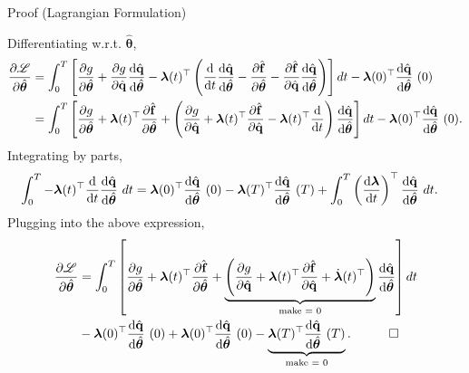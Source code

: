 \begin{frame}{Proof (Lagrangian Formulation)}

{\scriptsize
Differentiating w.r.t. $\hat{\bm{\theta}}$,
\begin{align*}
    \pdv{\mathscr{L}}{\hat{\bm{\theta}}} &= \int_0^T\left[ \pdv{g}{\hat{\bm{\theta}}} + \pdv{g}{\hat{\mathbf{q}}} \dv{\hat{\mathbf{q}}}{\hat{\bm{\theta}}} - \bm{\lambda}(t)^{\top} \left( \dv{t}\dv{\hat{\mathbf{q}}}{\hat{\bm{\theta}}} - \pdv{\hat{\mathbf{f}}}{\hat{\bm{\theta}}} - \pdv{\hat{\mathbf{f}}}{\hat{\mathbf{q}}}\dv{\hat{\mathbf{q}}}{\hat{\bm{\theta}}} \right) \right] dt - \bm{\lambda}(0)^{\top}\dv{\hat{\mathbf{q}}}{\hat{\bm{\theta}}}~(0)\notag\\
    &= \int_0^T \left[\pdv{g}{\hat{\bm{\theta}}} + \bm{\lambda}(t)^{\top} \pdv{\hat{\mathbf{f}}}{\hat{\bm{\theta}}}+ \left( \pdv{g}{\hat{\mathbf{q}}} + \bm{\lambda}(t)^{\top}\pdv{\hat{\mathbf{f}}}{\hat{\mathbf{q}}}-\bm{\lambda}(t)^{\top}\dv{t} \right)\dv{\hat{\mathbf{q}}}{\hat{\bm{\theta}}} \right]dt- \bm{\lambda}(0)^{\top}\dv{\hat{\mathbf{q}}}{\hat{\bm{\theta}}}~(0). 
\end{align*}
Integrating by parts,
\begin{align*}
    \int_0^T -\bm{\lambda}(t)^{\top}\dv{t}\dv{\hat{\mathbf{q}}}{\hat{\bm{\theta}}}~dt &= \bm{\lambda}(0)^{\top}\dv{\hat{\mathbf{q}}}{\hat{\bm{\theta}}}~(0) - \bm{\lambda}(T)^{\top}\dv{\hat{\mathbf{q}}}{\hat{\bm{\theta}}}~(T) + \int_0^T \left( \dv{\bm{\lambda}}{t}\right)^{\top}\dv{\hat{\mathbf{q}}}{\hat{\bm{\theta}}}~dt.
\end{align*}
Plugging into the above expression,
\begin{align*}
   \pdv{\mathscr{L}}{\hat{\bm{\theta}}} &= \int_0^T\left[ \pdv{g}{\hat{\bm{\theta}}} + \bm{\lambda}(t)^{\top} \pdv{\hat{\textbf{f}}}{\hat{\bm{\theta}}} + \underbrace{\left( \pdv{g}{\hat{\mathbf{q}}} + \bm{\lambda}(t)^{\top}\pdv{\hat{\mathbf{f}}}{\hat{\mathbf{q}}}+ \dot{\bm{\lambda}}(t)^{\top}\right)}_{\text{make = 0}} \dv{\hat{\mathbf{q}}}{\hat{\bm{\theta}}} \right]dt \\
   & - \bm{\lambda}(0)^{\top}\dv{\hat{\mathbf{q}}}{\hat{\bm{\theta}}}~(0)+\bm{\lambda}(0)^{\top}\dv{\hat{\mathbf{q}}}{\hat{\bm{\theta}}}~(0) - \underbrace{\bm{\lambda}(T)^{\top}\dv{\hat{\mathbf{q}}}{\hat{\bm{\theta}}}~(T)}_{\text{make = 0}}.\quad\qed
\end{align*}

}

\end{frame}


